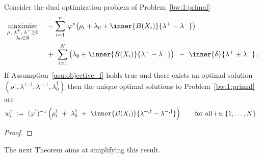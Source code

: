 \begin{lemma}
  Consider the dual optimization problem of Problem~\ref{bw:1:primal}
\begin{align*}
  \underset
  {\begin{smallmatrix}
\rho\,,\, \lambda^+,\,\lambda^-\ge 0 \\
\lambda_0\in\R
  \end{smallmatrix}}
  {
    \mathrm{maximize}
  }
  \quad
  &
  -
\sum_{i=1} 
  ^n
    \,
  \varphi^*
  \!
  \left( 
    \rho_i
    +
\lambda_0
+
\inner
{B(X_i)}
{
\lambda^+
-
\lambda^-
}
  \right)
  \\
  &
+
\ 
\sum_{i=1}^{N} 
  \left( 
\lambda_0
+
\inner
{B(X_i)}
{
\lambda^+
-
\lambda^-
}
  \right)
  \,
  \ 
-
\ 
\inner
{\delta}
{
\lambda^+
+
\lambda^-
}
  \,.
\end{align*}
If Assumption~\ref{asu:objective_f} holds true 
and there exists an optimal solution 
$
(\rho^\dagger,\lambda^{+,\dagger},\lambda^{-,\dagger},\lambda_0^\dagger)
$
then the unique optimal solutions to Problem~\ref{bw:1:primal} are 
\begin{gather*}
  w^\dagger_i
  \ 
  :=
  \ 
  (
  \varphi^{'}
  )^{-1}
  \left(
    \rho^\dagger_i
  \ 
    +
  \ 
\lambda_0^\dagger
  \ 
+
  \ 
\inner
{B(X_i)}
{
  \lambda^{+,\dagger}
-
\lambda^{-,\dagger}
}
  \right)
  \qquad
  \text{for all}\ 
  i\in
  \left\{ 1,\ldots,N \right\}
  \,.
\end{gather*}
\end{lemma}
\begin{proof}
\end{proof}
The next Theorem aims at simplifying this result. 

